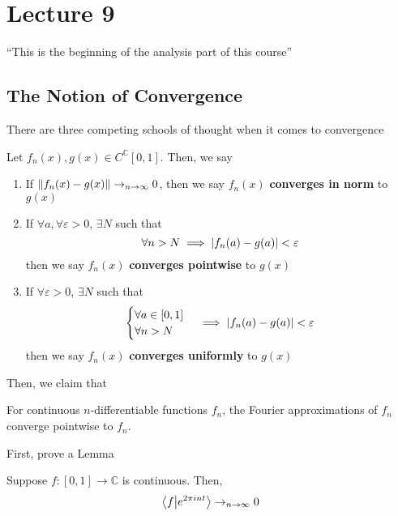 \section{Lecture 9}
``This is the beginning of the analysis part of this course''
\subsection{The Notion of Convergence}
There are three competing schools of thought when it comes to convergence
\begin{definition}
    Let $f_n(x), g(x) \in C^\mathbb{C}[0,1]$. Then, we say
    \begin{enumerate}
        \item If $\norm{f_n(x) - g(x)} \to_{n\to\infty} 0$, then we say $f_n(x)$ \textbf{converges in norm} to $g(x)$
        \item If $\forall a, \forall \varepsilon > 0$, $\exists N$ such that
        $$\forall n > N \implies \abs{f_n(a) - g(a)} < \varepsilon$$
        then we say $f_n(x)$ \textbf{converges pointwise} to $g(x)$
        \item If $\forall \varepsilon > 0$, $\exists N$ such that
        \begin{align}
            \begin{cases}
                \forall a \in [0,1]\\
                \forall n > N
            \end{cases}
            \implies \abs{f_n(a) - g(a)} < \varepsilon
        \end{align}
        then we say $f_n(x)$ \textbf{converges uniformly} to $g(x)$
    \end{enumerate}
\end{definition}
Then, we claim that
\begin{proposition}
    For continuous $n$-differentiable functions $f_n$, the Fourier approximations of $f_n$ converge pointwise to $f_n$.
\end{proposition}
First, prove a Lemma
\begin{lemma}
    Suppose $f: [0,1] \to \mathbb{C}$ is continuous. Then,
    \begin{align}
        \braket{f}{e^{2\pi int}} \to_{n\to\infty} 0
    \end{align}
\end{lemma}
